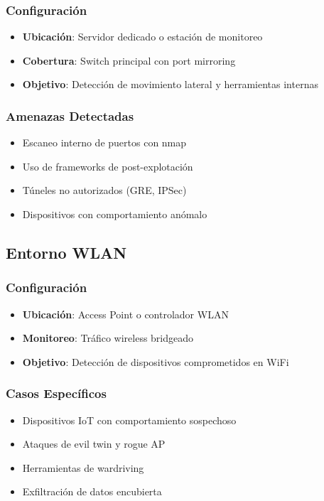 \documentclass[12pt,a4paper]{article}
\begin{document}
\subsubsection{Configuración}
\begin{itemize}
    \item \textbf{Ubicación}: Servidor dedicado o estación de monitoreo
    \item \textbf{Cobertura}: Switch principal con port mirroring
    \item \textbf{Objetivo}: Detección de movimiento lateral y herramientas internas
\end{itemize}

\subsubsection{Amenazas Detectadas}
\begin{itemize}
    \item Escaneo interno de puertos con nmap
    \item Uso de frameworks de post-explotación
    \item Túneles no autorizados (GRE, IPSec)
    \item Dispositivos con comportamiento anómalo
\end{itemize}

\subsection{Entorno WLAN}

\subsubsection{Configuración}
\begin{itemize}
    \item \textbf{Ubicación}: Access Point o controlador WLAN
    \item \textbf{Monitoreo}: Tráfico wireless bridgeado
    \item \textbf{Objetivo}: Detección de dispositivos comprometidos en WiFi
\end{itemize}

\subsubsection{Casos Específicos}
\begin{itemize}
    \item Dispositivos IoT con comportamiento sospechoso
    \item Ataques de evil twin y rogue AP
    \item Herramientas de wardriving
    \item Exfiltración de datos encubierta
\end{itemize}
\end{document}
